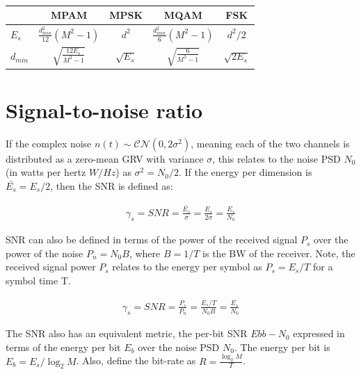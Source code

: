 \documentclass[12pt]{report} %
\begin{document}
\begin{table}[htbp]
  \centering
  \caption{}
  \begin{tabular}{lcccc}                                                                                                                   \\
    \cmidrule(r){1-5}  & MPAM                           & MPSK                       & MQAM                         & FSK     \\
    \midrule $E_s$     & $\frac{d_{min}^2}{12}(M^2-1)$  & $d^2$                      & $\frac{d_{min}^2}{6}(M^2-1)$ & $d^2/2$ \\
    \midrule $d_{min}$ & $\sqrt{\frac{12E_s}{M^2 - 1}}$
                       & $\sqrt{E_s}$                   & $\sqrt{\frac{6}{M^2 - 1}}$ & $\sqrt{2 E_s}$                         \\

    \bottomrule
  \end{tabular}
  \label{tab:win-space-results}
\end{table}


\section{Signal-to-noise ratio}


If the complex noise $n(t) \sim \mathcal{C}\mathcal{N}(0,2\sigma^2)$, meaning
each of the two channels is distributed as a zero-mean \gls{GRV} with variance
$\sigma$, this relates to the noise \gls{PSD} $N_0$ (in watts per hertz $W/Hz$)
as $\sigma^2 = N_0/2$. If the energy per dimension is $\bar{E_s} = E_s/2$, then
the \gls{SNR} is defined as:


\begin{align}
  \gamma_s = SNR = \frac{\bar{E_s}}{\sigma} = \frac{E_s}{2\sigma} = \frac{E_s}{N_0}
\end{align}

\Gls{SNR} can also be defined in terms of the power of the received signal $P_s$
over the power of the noise $P_n = N_0 B$, where $B = 1/T$ is the \gls{BW} of
the receiver. Note, the received signal power $P_s$ relates to the energy per
symbol as $P_s = E_s/T$ for a symbol time T.

\begin{align}
  \gamma_s = SNR = \frac{P_s}{P_n}= \frac{E_s/T}{N_0 B} = \frac{E_s}{N_0}
\end{align}


The \gls{SNR} also has an equivalent metric, the per-bit \gls{SNR} $Ebb-N_0$
expressed in terms of the energy per bit $E_b$ over the noise \gls{PSD} $N_0$.
The energy per bit is $E_b = E_s/\log _{2} M$. Also, define the bit-rate as $R =
  \frac{\log _{2} M}{T}$.
\end{document}
